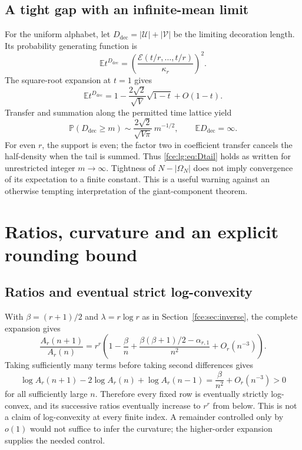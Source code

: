 \documentclass[11pt,a4paper]{article}
\numberwithin{equation}{section}
\theoremstyle{definition}\newtheorem{definition}[theorem]{Definition}
\theoremstyle{remark}\newtheorem{remark}[theorem]{Remark}
\newcommand{\E}{\mathcal E}
\newcommand{\Prob}{\mathbb P}
\newcommand{\Exp}{\mathbb E}
\begin{document}
\subsection{A tight gap with an infinite-mean limit}
For the uniform alphabet, let $D_{\mathrm{dec}}=|\mathcal U|+|\mathcal V|$
be the limiting decoration length. Its probability generating function is
\begin{equation}\label{fce:lg:eq:Dpgf}
 \Exp t^{D_{\mathrm{dec}}}=\left(\frac{\E(t/r,\ldots,t/r)}{\kappa_r}\right)^2.
\end{equation}
The square-root expansion at $t=1$ gives
\[
 \Exp t^{D_{\mathrm{dec}}}=1-\frac{2\sqrt2}{\sqrt V}\sqrt{1-t}+O(1-t).
\]
Transfer and summation along the permitted time lattice yield
\begin{equation}\label{fce:lg:eq:Dtail}
 \Prob(D_{\mathrm{dec}}\ge m)\sim\frac{2\sqrt2}{\sqrt{V\pi}}\,m^{-1/2},\qquad
 \Exp D_{\mathrm{dec}}=\infty.
\end{equation}
For even $r$, the support is even; the factor two in coefficient transfer
cancels the half-density when the tail is summed. Thus
\eqref{fce:lg:eq:Dtail} holds as written for unrestricted integer
$m\to\infty$. Tightness of $N-|\Omega_N|$ does not imply convergence of its
expectation to a finite constant. This is a useful warning against an
otherwise tempting interpretation of the giant-component theorem.

\section{Ratios, curvature and an explicit rounding bound}\label{fce:lg:sec:inverse}
\subsection{Ratios and eventual strict log-convexity}
With $\beta=(r+1)/2$ and $\lambda=r\log r$ as in
Section~\ref{fce:sec:inverse}, the complete expansion gives
\begin{equation}\label{fce:lg:eq:ratio}
 \frac{A_r(n+1)}{A_r(n)}
 =r^r\left(1-\frac{\beta}{n}
 +\frac{\beta(\beta+1)/2-\alpha_{r,1}}{n^2}
 +O_r(n^{-3})\right).
\end{equation}
Taking sufficiently many terms before taking second differences gives
\begin{equation}\label{fce:lg:eq:logconvex}
 \log A_r(n+1)-2\log A_r(n)+\log A_r(n-1)
 =\frac{\beta}{n^2}+O_r(n^{-3})>0
\end{equation}
for all sufficiently large $n$. Therefore every fixed row is eventually
strictly log-convex, and its successive ratios eventually increase to $r^r$
from below. This is not a claim of log-convexity at every finite index. A
remainder controlled only by $o(1)$ would not suffice to infer the
curvature; the higher-order expansion supplies the needed control.
\end{document}
